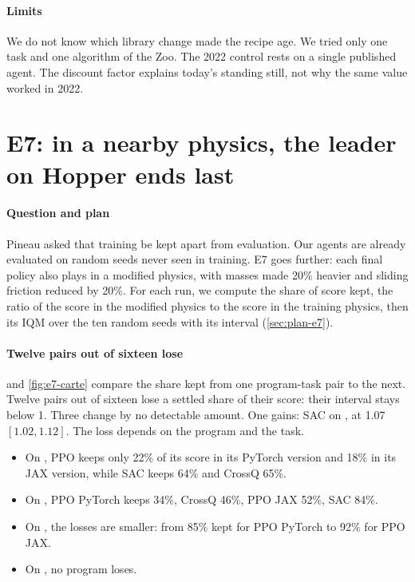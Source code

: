 \paragraph{Limits}
We do not know which library change made the recipe age. We tried only one task and one algorithm of the
Zoo. The 2022 control rests on a single published agent. The discount factor
explains today's standing still, not why the same value worked in 2022.

\section{E7: in a nearby physics, the leader on Hopper ends last}\label{sec:e7}

\paragraph{Question and plan}
Pineau asked that training be kept apart from evaluation. Our agents are already evaluated on random seeds
never seen in training. E7 goes further: each final policy also plays in a modified physics, with masses made
20\% heavier and sliding friction reduced by 20\%. For each run, we compute the share of score kept, the ratio
of the score in the modified physics to the score in the training physics, then its IQM over the ten random
seeds with its interval (\cref{sec:plan-e7}).

\paragraph{Twelve pairs out of sixteen lose}
 and \cref{fig:e7-carte} compare the share kept from one program-task pair to the next. Twelve pairs out of
sixteen lose a settled share of their score: their interval stays below 1. Three change by no
detectable amount. One gains: SAC on , at 1.07 $[1.02, 1.12]$. The loss depends on the program
and the task.
\begin{itemize}
  \item On , PPO keeps only 22\% of its score in its PyTorch version and 18\% in its JAX version,
    while SAC keeps 64\% and CrossQ 65\%.
  \item On , PPO PyTorch keeps 34\%, CrossQ 46\%, PPO JAX 52\%, SAC 84\%.
  \item On , the losses are smaller: from 85\% kept for PPO PyTorch to 92\% for PPO JAX.
  \item On , no program loses.
\end{itemize}

